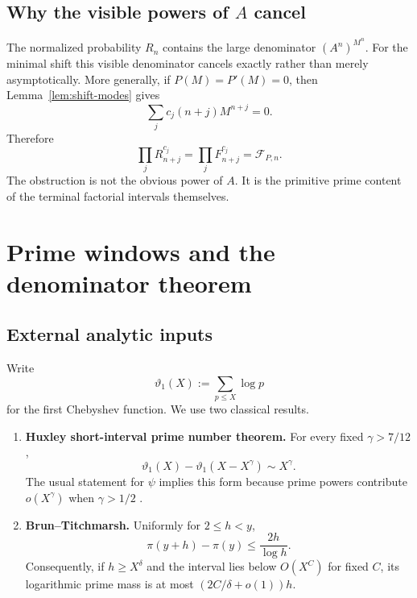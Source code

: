 \documentclass[11pt,oneside]{article}
\theoremstyle{definition}
\theoremstyle{remark}
\newcommand{\cF}{\mathcal F}
\begin{document}
\subsection{Why the visible powers of \texorpdfstring{$A$}{A} cancel}

The normalized probability $R_n$ contains the large denominator $(A^n)^{M^n}$.  For the
minimal shift this visible denominator cancels exactly rather than merely asymptotically.
More generally, if $P(M)=P'(M)=0$, then Lemma~\ref{lem:shift-modes} gives
\begin{equation}
 \sum_jc_j(n+j)M^{n+j}=0.
 \label{eq:A-power-cancellation}
\end{equation}
Therefore
\begin{equation}
 \prod_jR_{n+j}^{c_j}=\prod_jF_{n+j}^{c_j}=\cF_{P,n}.
 \label{eq:R-to-F-cancellation}
\end{equation}
The obstruction is not the obvious power of $A$.  It is the primitive prime content of the
terminal factorial intervals themselves.

\section{Prime windows and the denominator theorem}
\label{sec:primewindows}

\subsection{External analytic inputs}

Write
\begin{equation}
 \vartheta_1(X):=\sum_{p\le X}\log p
 \label{eq:chebyshev-theta}
\end{equation}
for the first Chebyshev function.  We use two classical results.

\begin{enumerate}
\item \textbf{Huxley short-interval prime number theorem.}
For every fixed $\gamma>7/12$,
\begin{equation}
 \vartheta_1(X)-\vartheta_1(X-X^\gamma)\sim X^\gamma.
 \label{eq:huxley}
\end{equation}
The usual statement for $\psi$ implies this form because prime powers contribute
$o(X^\gamma)$ when $\gamma>1/2$ \cite{Huxley1972}.

\item \textbf{Brun--Titchmarsh.}
Uniformly for $2\le h<y$,
\begin{equation}
 \pi(y+h)-\pi(y)\le\frac{2h}{\log h}.
 \label{eq:BT}
\end{equation}
Consequently, if $h\ge X^\delta$ and the interval lies below $O(X^C)$ for fixed $C$, its
logarithmic prime mass is at most $(2C/\delta+o(1))h$\cite{MontgomeryVaughan2007}.
\end{enumerate}
\end{document}
